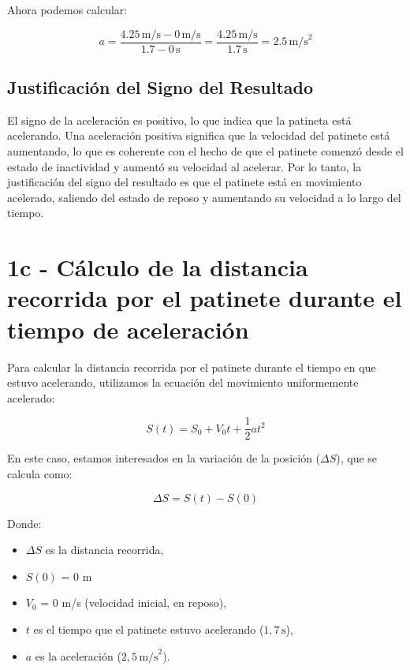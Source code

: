 \documentclass{article}
\begin{document}
Ahora podemos calcular:

\[
a = \frac{4.25 \, \text{m/s} - 0 \, \text{m/s}}{1.7 - 0 \, \text{s}} = \frac{4.25 \, \text{m/s}}{1.7 \, \text{s}} = \boxed {2.5 \, \text{m/s}^2}
\]

\subsection*{Justificación del Signo del Resultado}

El signo de la aceleración es positivo, lo que indica que la patineta está acelerando. Una aceleración positiva significa que la velocidad del patinete está aumentando, lo que es coherente con el hecho de que el patinete comenzó desde el estado de inactividad y aumentó su velocidad al acelerar. Por lo tanto, la justificación del signo del resultado es que el patinete está en movimiento acelerado, saliendo del estado de reposo y aumentando su velocidad a lo largo del tiempo.


\section*{1c - Cálculo de la distancia recorrida por el patinete durante el tiempo de aceleración}

Para calcular la distancia recorrida por el patinete durante el tiempo en que estuvo acelerando, utilizamos la ecuación del movimiento uniformemente acelerado:

\[
S(t) = S_0 + V_0 t + \frac{1}{2} a t^2
\]

En este caso, estamos interesados en la variación de la posición (\(\Delta S\)), que se calcula como:

\[
\Delta S = S(t) - S(0)
\]

Donde:
\begin{itemize}
    \item \(\Delta S\) es la distancia recorrida,
    \item \(S(0)\) = 0 m
    \item \(V_0\) = 0 m/s (velocidad inicial, en reposo),
    \item \(t\) es el tiempo que el patinete estuvo acelerando (\(1,7 \, \text{s}\)),
    \item \(a\) es la aceleración (\(2,5 \, \text{m/s}^2\)).
\end{itemize}
\end{document}
